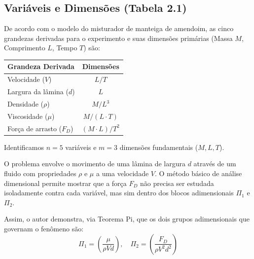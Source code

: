 \subsection*{Variáveis e Dimensões (Tabela 2.1)}

De acordo com o modelo do misturador de manteiga de amendoim, as cinco grandezas derivadas para o experimento e suas dimensões primárias (Massa $M$, Comprimento $L$, Tempo $T$) são:

\begin{table}[h]
\centering
\begin{tabular}{lc}
\toprule

\textbf{Grandeza Derivada} & \textbf{Dimensões} \\ \midrule
Velocidade ($V$) & $L/T$ \\
Largura da lâmina ($d$) & $L$ \\
Densidade ($\rho$) & $M/L^3$ \\
Viscosidade ($\mu$) & $M/(L \cdot T)$ \\
Força de arrasto ($F_D$) & $(M \cdot L)/T^2$ \\ \bottomrule
\end{tabular}
\end{table}

Identificamos $n=5$ variáveis e $m=3$ dimensões fundamentais ($M, L, T$).

O problema envolve o movimento de uma lâmina de largura $d$ através de um fluido com propriedades $\rho$ e $\mu$ a uma velocidade $V$. O método básico de análise dimensional permite mostrar que a força $F_D$ não precisa ser estudada isoladamente contra cada variável, mas sim dentro dos blocos adimensionais $\Pi_1$ e $\Pi_2$.


Assim, o autor demonstra, via Teorema Pi, que os dois grupos adimensionais que governam o fenômeno são:
\begin{equation*}
    \Pi_1 = \left( \frac{\mu}{\rho V d} \right), \quad \Pi_2 = \left( \frac{F_D}{\rho V^2 d^2} \right) 
\end{equation*}

